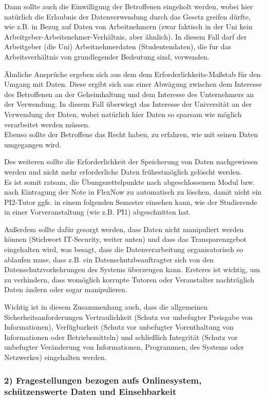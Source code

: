 \documentclass{swp1}
\begin{document}
Dann sollte auch die Einwilligung der Betroffenen eingeholt werden, wobei hier natürlich die Erlaubnis der Datenverwendung durch das Gesetz greifen dürfte, wie z.B. in Bezug auf Daten von Arbeitnehmern (zwar faktisch in der Uni kein Arbeitgeber-Arbeitsnehmer-Verhältnis, aber ähnlich). In diesem Fall darf der Arbeitgeber (die Uni) Arbeitnehmerdaten (Studentendaten), die fur das Arbeitsverhältnis von grundlegender Bedeutung sind, verwenden. 

Ähnliche Ansprüche ergeben sich aus dem dem Erforderlichkeits-Maßstab
für den Umgang mit Daten. Diese ergibt sich aus einer Abwägung zwischen dem Interesse des Betroffenen an der
Geheimhaltung und dem Interesse des Unternehmers an der Verwendung. In diesem Fall überwiegt das Interesse der Universität an der Verwendung der Daten, wobei natürlich hier Daten so sparsam wie möglich verarbeitet werden müssen.\\
Ebenso sollte der Betroffene das Recht haben, zu erfahren, wie mit seinen Daten umgegangen wird.

Des weiteren sollte die Erforderlichkeit der Speicherung von Daten nachgewiesen werden und nicht mehr erforderliche Daten frühestmöglich gelöscht werden. \\Es ist somit ratsam, die Übungszettelpunkte nach abgeschlossenem Modul bzw. nach Eintragung der Note in FlexNow zu automatisch zu löschen, damit nicht ein PI2-Tutor ggfs. in einem folgenden Semester einsehen kann, wie der Studierende in einer Vorveranstaltung (wie z.B. PI1) abgeschnitten hat. 

Außerdem sollte dafür gesorgt werden, dass Daten nicht manipuliert werden können (Stichwort IT-Security, weiter unten) und dass das Transparenzgebot eingehalten wird, was besagt, dass die Datenverarbeitung organisatorisch
so ablaufen muss, dass z.B. ein
Datenschutzbeauftragter sich von den Datenschutzvorkehrungen des Systems überzeugen kann. Ersteres ist wichtig, um zu verhindern, dass womöglich korrupte Tutoren oder Veranstalter nachträglich Daten ändern oder sogar manipulieren.

Wichtig ist in diesem Zusammenhang auch, dass die allgemeinen Sicherheitsanforderungen Vertraulichkeit (Schutz vor unbefugter Preisgabe von
Informationen), Verfügbarkeit (Schutz vor unbefugter Vorenthaltung von Informationen oder Betriebsmitteln) und schließlich Integrität (Schutz vor unbefugter Veränderung von
Informationen, Programmen, des Systems oder Netzwerkes) eingehalten werden. 

\subsubsection*{2) Fragestellungen bezogen aufs Onlinesystem, schützenswerte Daten und Einsehbarkeit}
\end{document}
